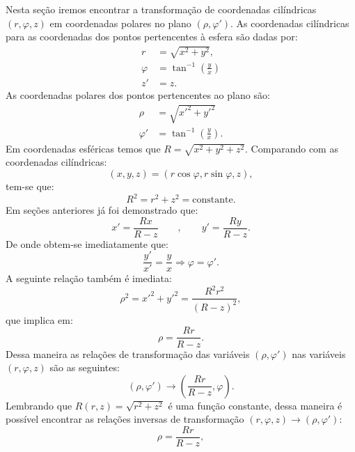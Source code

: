 Nesta seção iremos encontrar a transformação de 
coordenadas cilíndricas $(r,\varphi,z)$ em coordenadas 
polares no plano $(\rho,\varphi')$. As coordenadas 
cilíndricas para as coordenadas dos pontos pertencentes 
à esfera são dadas por:
%
\begin{align}
r       &= \sqrt{x^2 + y^2}, 
\\
\varphi &= \tan^{-1}\left(\frac{y}{x}\right) 
\\
z'      &= z.
\end{align}
%
As coordenadas polares dos pontos pertencentes ao plano são:
%
\begin{align}
\rho     &= \sqrt{{x'}^2 + {y'}^2} 
\\ 
\varphi' &= \tan^{-1}\left(\frac{y}{x}\right).
\end{align}
%
Em coordenadas esféricas temos que $R = 
\sqrt{x^2 + y^2 + z^2}$. Comparando com as 
coordenadas cilíndricas:
%
\begin{equation}
(x, y, z) = (r\cos\varphi, r\sin\varphi, z), 
\end{equation}
%
tem-se que:
%
\begin{equation}
R^2 = r^2 + z^2 = \mbox{constante}.
\end{equation}
%
Em seções anteriores já foi demonstrado que:
%
\begin{equation}
x' = \frac{Rx}{R - z} \qquad , \qquad y' = \frac{Ry}{R - z}.
\end{equation}
%
De onde obtem-se imediatamente que:
%
\begin{equation}
\frac{y'}{x'} = \frac{y}{x} \Rightarrow \varphi = \varphi'.
\end{equation}
%
A seguinte relação também é imediata:
%
\begin{equation}
\rho^2 = {x'}^2 + {y'}^2 = \frac{R^2r^2}{(R - z)^2}, 
\end{equation}
%
que implica em:
%
\begin{equation}
\rho = \frac{Rr}{R -z}.
\end{equation}
%
Dessa maneira as relações de transformação das variáveis 
$(\rho,\varphi')$ nas variáveis $(r,\varphi,z)$ são 
as seguintes:
%
\begin{equation}
(\rho,\varphi') \to \left(\frac{Rr}{R - z},\varphi\right).
\end{equation}
%
Lembrando que $R(r,z) = \sqrt{r^2 + z^2}$ é uma função 
constante, dessa maneira é possível encontrar as relações 
inversas de transformação $(r,\varphi,z)\to(\rho,\varphi')$:
%
\begin{equation}
\rho = \frac{Rr}{R - z}, 
\end{equation}

